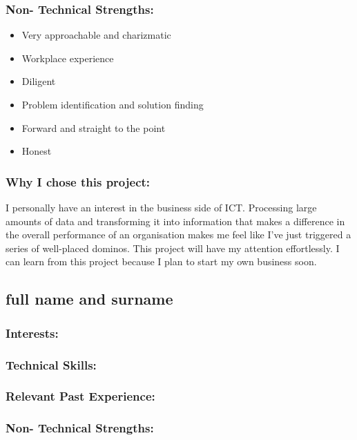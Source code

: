 \subsubsection{Non- Technical Strengths:}
\begin{itemize}
	\item Very approachable and charizmatic
	\item Workplace experience
	\item Diligent
	\item Problem identification and solution finding
	\item Forward and straight to the point
	\item Honest
\end{itemize}

\subsubsection{Why I chose this project:}
\par{I personally have an interest in the business side of ICT. Processing large amounts of data and transforming it into information that makes a difference in the overall performance of an organisation makes me feel like I've just triggered a series of well-placed dominos. This project will have my attention effortlessly. I can learn from this project because I plan to start my own business soon.}

\newpage
\subsection{full name and surname}

\subsubsection{Interests:}

\subsubsection{Technical Skills:}

\subsubsection{Relevant Past Experience:}

\subsubsection{Non- Technical Strengths:}

